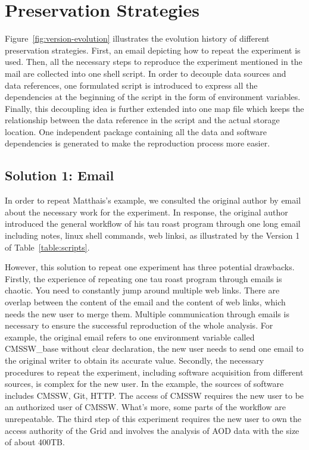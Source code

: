\documentclass{sig-alternate}
\begin{document}
\fi

\section{Preservation Strategies}

Figure~\ref{fig:version-evolution} illustrates the evolution history of
different preservation strategies. First, an email depicting how to repeat the
experiment is used. Then, all the necessary steps to reproduce the experiment
mentioned in the mail are collected into one shell script. In order to decouple
data sources and data references, one formulated script is introduced
to express all the dependencies at the beginning of the script in the form of
environment variables. Finally, this decoupling idea is further extended into
one map file which keeps the relationship between the data reference in the
script and the actual storage location. One independent package containing all
the data and software dependencies is generated to make the reproduction
process more easier.  

\subsection{Solution 1: Email}

In order to repeat Matthais's example, we consulted the original
author by email about the necessary work for the experiment. In response,
the original author introduced the general workflow of his tau roast program through one long
email including notes, linux shell commands, web linksi, as illustrated by the Version 1 of
Table~\ref{table:scripts}.

However, this solution to repeat one experiment has three potential drawbacks.
Firstly, the experience of repeating one tau roast program through emails is
chaotic. You need to constantly jump around multiple web links. There are overlap
between the content of the email and the content of web links, which needs the
new user to merge them. Multiple communication through emails is necessary to
ensure the successful reproduction of the whole analysis. For example, the original
email refers to one environment variable called CMSSW\_base without clear
declaration, the new user needs to send one email to the original writer to
obtain its accurate value. Secondly, the necessary procedures to repeat the
experiment, including software acquisition from different sources, is complex
for the new user. In the example, the sources of software includes
CMSSW, Git, HTTP. The access of CMSSW requires the new user to be an authorized
user of CMSSW. What's more, some parts of the workflow are unrepeatable. The
third step of this experiment requires the new user to own the access authority
of the Grid and involves the analysis of AOD data with the size of about 400TB.
\end{document}
